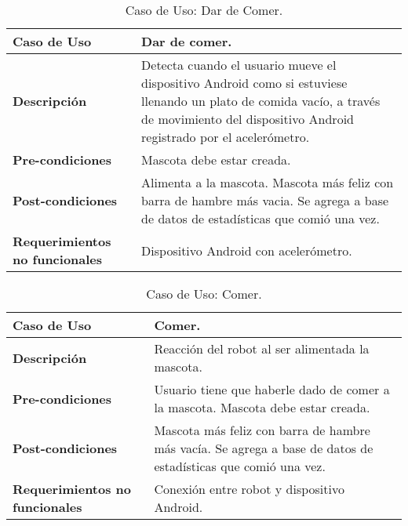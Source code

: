 \begin{table}[htbp!]
  \centering
  \begin{tabular}{|p{4cm}|p{6cm}|}\hline
    \bf{Caso de Uso}                   & Dar de comer. \\ \hline
    \bf{Descripci\'on}                 & Detecta cuando el usuario mueve el dispositivo Android como si estuviese llenando un plato de comida vac\'io, a trav\'es de movimiento del dispositivo Android registrado por el aceler\'ometro. \\ \hline
    \bf{Pre-condiciones}               & Mascota debe estar creada. \\ \hline
    \bf{Post-condiciones}              & Alimenta a la mascota. Mascota m\'as feliz con barra de hambre m\'as vacia. Se agrega a base de datos de estad\'isticas que comi\'o una vez.   \\ \hline
    \bf{Requerimientos no funcionales} & Dispositivo Android con aceler\'ometro. \\ \hline
  \end{tabular}
  \caption[~Caso de Uso: Dar de Comer]{Caso de Uso: Dar de Comer.}
  \label{table:DarComer}
\end{table}

\begin{table}[htbp!]
  \centering
  \begin{tabular}{|p{4cm}|p{6cm}|}\hline
    \bf{Caso de Uso}                   & Comer. \\ \hline
    \bf{Descripci\'on}                 & Reacci\'on del robot al ser alimentada la mascota. \\ \hline
    \bf{Pre-condiciones}               & Usuario tiene que haberle dado de comer a la mascota. Mascota debe estar creada. \\ \hline
    \bf{Post-condiciones}              & Mascota m\'as feliz con barra de hambre m\'as vac\'ia. Se agrega a base de datos de estad\'isticas que comi\'o una vez. \\ \hline
    \bf{Requerimientos no funcionales} & Conexi\'on entre robot y dispositivo Android. \\ \hline
  \end{tabular}
  \caption[~~Caso de Uso: Comer]{Caso de Uso: Comer.}
  \label{table:Comer}
\end{table}

